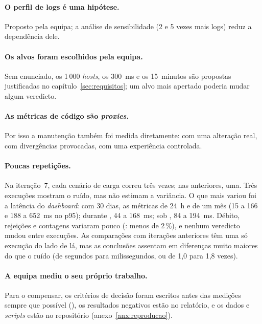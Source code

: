 \paragraph{O perfil de logs é uma hipótese.}
Proposto pela equipa; a análise de sensibilidade (2 e 5 vezes mais logs) reduz a dependência dele.

\paragraph{Os alvos foram escolhidos pela equipa.}
Sem enunciado, os 1\,000 \emph{hosts}, os 300~ms e os 15~minutos são propostas justificadas no
capítulo~\ref{sec:requisitos}; um alvo mais apertado poderia mudar algum veredicto.

\paragraph{As métricas de código são \emph{proxies}.}
Por isso a manutenção também foi medida diretamente:  com uma alteração real,  com divergências
provocadas,  com uma experiência controlada.

\paragraph{Poucas repetições.}
Na iteração~7, cada cenário de carga correu três vezes; nas anteriores, uma. Três execuções mostram o ruído, mas
não estimam a variância. O que mais variou foi a latência do \emph{dashboard}: com 30 dias, as métricas de 24~h e
de um mês (15 a 166 e 188 a 652~ms no p95); durante , 44 a 168~ms; sob , 84 a 194~ms. Débito,
rejeições e contagens variaram pouco (: menos de 2\,\%), e nenhum veredicto mudou entre execuções. As comparações com iterações anteriores têm
uma só execução do lado de lá, mas as conclusões assentam em diferenças muito maiores do que o ruído (de segundos para milissegundos, ou de 1,0
para 1,8 vezes).

\paragraph{A equipa mediu o seu próprio trabalho.}
Para o compensar, os critérios de decisão foram escritos antes das medições sempre que possível (), os
resultados negativos estão no relatório, e os dados e \emph{scripts} estão no repositório
(anexo~\ref{anx:reproducao}).
